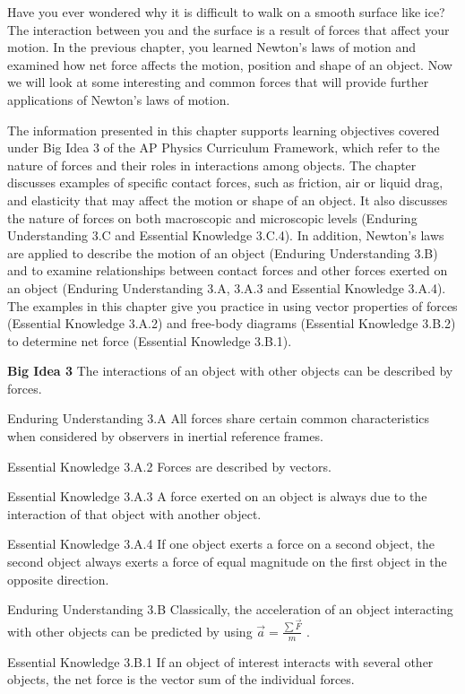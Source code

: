 \documentclass[
]{book}
\begin{document}
Have you ever wondered why it is difficult to walk on a smooth surface
like ice? The interaction between you and the surface is a result of
forces that affect your motion. In the previous chapter, you learned
Newton's laws of motion and examined how net force affects the motion,
position and shape of an object. Now we will look at some interesting
and common forces that will provide further applications of Newton's
laws of motion.

The information presented in this chapter supports learning objectives
covered under Big Idea 3 of the AP Physics Curriculum Framework, which
refer to the nature of forces and their roles in interactions among
objects. The chapter discusses examples of specific contact forces, such
as friction, air or liquid drag, and elasticity that may affect the
motion or shape of an object. It also discusses the nature of forces on
both macroscopic and microscopic levels (Enduring Understanding 3.C and
Essential Knowledge 3.C.4). In addition, Newton's laws are applied to
describe the motion of an object (Enduring Understanding 3.B) and to
examine relationships between contact forces and other forces exerted on
an object (Enduring Understanding 3.A, 3.A.3 and Essential Knowledge
3.A.4). The examples in this chapter give you practice in using vector
properties of forces (Essential Knowledge 3.A.2) and free-body diagrams
(Essential Knowledge 3.B.2) to determine net force (Essential Knowledge
3.B.1).

\textbf{Big Idea 3} The interactions of an object with other objects can be
described by forces.

Enduring Understanding 3.A All forces share certain common
characteristics when considered by observers in inertial reference
frames.

Essential Knowledge 3.A.2 Forces are described by vectors.

Essential Knowledge 3.A.3 A force exerted on an object is always due to
the interaction of that object with another object.

Essential Knowledge 3.A.4 If one object exerts a force on a second
object, the second object always exerts a force of equal magnitude on
the ﬁrst object in the opposite direction.

Enduring Understanding 3.B Classically, the acceleration of an object
interacting with other objects can be predicted by using
\(\overset{\rightarrow}{a} = \frac{\sum\overset{\rightarrow}{F}}{m}\) .

Essential Knowledge 3.B.1 If an object of interest interacts with
several other objects, the net force is the vector sum of the individual
forces.
\end{document}
